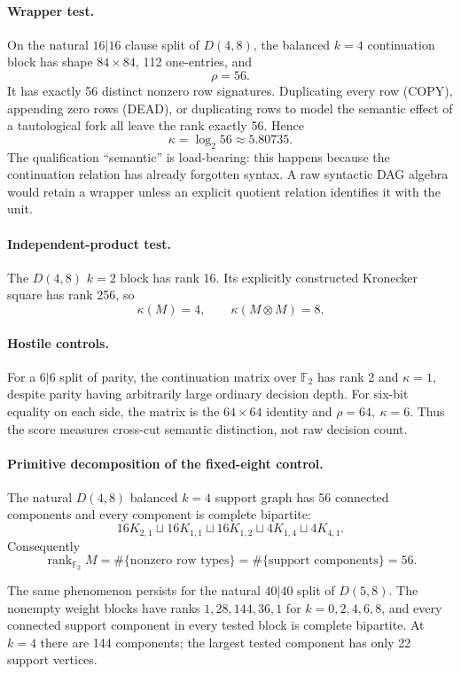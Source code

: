 \paragraph{Wrapper test.}
On the natural $16|16$ clause split of $D(4,8)$, the balanced $k=4$ continuation block has
shape $84\times84$, 112 one-entries, and
\[\rho=56.\]
It has exactly 56 distinct nonzero row signatures. Duplicating every row (COPY), appending
zero rows (DEAD), or duplicating rows to model the semantic effect of a tautological fork all
leave the rank exactly 56. Hence
\[\kappa=\log_2 56\approx5.80735.\]
The qualification ``semantic'' is load-bearing: this happens because the continuation
relation has already forgotten syntax. A raw syntactic DAG algebra would retain a wrapper
unless an explicit quotient relation identifies it with the unit.

\paragraph{Independent-product test.}
The $D(4,8)$ $k=2$ block has rank 16. Its explicitly constructed Kronecker square has rank
256, so
\[\kappa(M)=4,\qquad \kappa(M\otimes M)=8.\]

\paragraph{Hostile controls.}
For a $6|6$ split of parity, the continuation matrix over $\mathbb F_2$ has rank 2 and
$\kappa=1$, despite parity having arbitrarily large ordinary decision depth. For six-bit
equality on each side, the matrix is the $64\times64$ identity and
$\rho=64,\ \kappa=6$. Thus the score measures cross-cut semantic distinction, not raw
decision count.

\paragraph{Primitive decomposition of the fixed-eight control.}
The natural $D(4,8)$ balanced $k=4$ support graph has 56 connected components and every
component is complete bipartite:
\[
16K_{2,1}\sqcup16K_{1,1}\sqcup16K_{1,2}\sqcup4K_{1,4}\sqcup4K_{4,1}.
\]
Consequently
\[
\operatorname{rank}_{\mathbb F_2}M
=\#\{\text{nonzero row types}\}
=\#\{\text{support components}\}=56.
\]

The same phenomenon persists for the natural $40|40$ split of $D(5,8)$. The nonempty
weight blocks have ranks $1,28,144,36,1$ for $k=0,2,4,6,8$, and every connected
support component in every tested block is complete bipartite. At $k=4$ there are 144
components; the largest tested component has only 22 support vertices.

